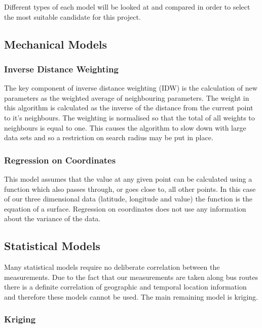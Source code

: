 Different types of each model will be looked at and compared in order to select the most suitable candidate for this project. 

\subsection{Mechanical Models}\label{mechanicalmodels}

\subsubsection{Inverse Distance Weighting}\label{inverseweight}

The key component of inverse distance weighting (IDW) is the calculation of new parameters as the weighted average of neighbouring parameters. The weight in this algorithm is calculated as the inverse of the distance from the current point to it's neighbours. The weighting is normalised so that the total of all weights to neighbours is equal to one. This causes the algorithm to slow down with large data sets and so a restriction on search radius may be put in place. 

\subsubsection{Regression on Coordinates}\label{regressiononcoordinates}

This model assumes that the value at any given point can be calculated using a function which also passes through, or goes close to, all other points. In this case of our three dimensional data (latitude, longitude and value) the function is the equation of a surface. Regression on coordinates does not use any information about the variance of the data. 

\subsection{Statistical Models}\label{statisticalmodels}

Many statistical models require no deliberate correlation between the measurements. Due to the fact that our measurements are taken along bus routes there is a definite correlation of geographic and temporal location information and therefore these models cannot be used. The main remaining model is kriging.

\subsubsection{Kriging}

